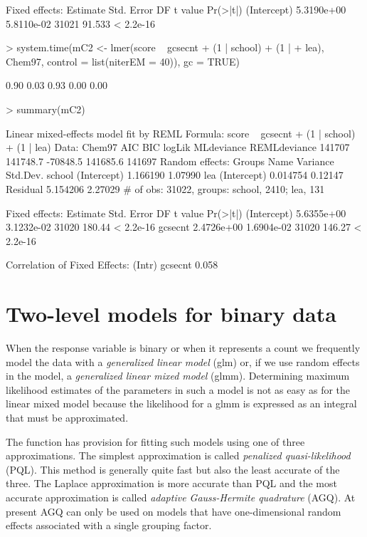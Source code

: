 \documentclass[12pt]{article}
\begin{document}
\begin{Schunk}
\begin{Soutput}
Fixed effects:
              Estimate Std. Error    DF t value  Pr(>|t|)
(Intercept) 5.3190e+00 5.8110e-02 31021  91.533 < 2.2e-16
\end{Soutput}
\begin{Sinput}
> system.time(mC2 <- lmer(score ~ gcsecnt + (1 | school) + (1 | 
+     lea), Chem97, control = list(niterEM = 40)), gc = TRUE)
\end{Sinput}
\begin{Soutput}
[1] 0.90 0.03 0.93 0.00 0.00
\end{Soutput}
\begin{Sinput}
> summary(mC2)
\end{Sinput}
\begin{Soutput}
Linear mixed-effects model fit by REML
Formula: score ~ gcsecnt + (1 | school) + (1 | lea) 
   Data: Chem97 
    AIC      BIC   logLik MLdeviance REMLdeviance
 141707 141748.7 -70848.5   141685.6       141697
Random effects:
 Groups   Name        Variance Std.Dev.
 school   (Intercept) 1.166190 1.07990 
 lea      (Intercept) 0.014754 0.12147 
 Residual             5.154206 2.27029 
# of obs: 31022, groups: school, 2410; lea, 131

Fixed effects:
              Estimate Std. Error    DF t value  Pr(>|t|)
(Intercept) 5.6355e+00 3.1232e-02 31020  180.44 < 2.2e-16
gcsecnt     2.4726e+00 1.6904e-02 31020  146.27 < 2.2e-16

Correlation of Fixed Effects:
        (Intr)
gcsecnt 0.058 
\end{Soutput}
\end{Schunk}


\section{Two-level models for binary data}
\label{sec:TwolevelBinary}

When the response variable is binary or when it represents a count we
frequently model the data with a \emph{generalized linear model} (glm)
or, if we use random effects in the model, a \emph{generalized linear
  mixed model} (glmm).  Determining maximum likelihood estimates of
the parameters in such a model is not as easy as for the linear mixed
model because the likelihood for a glmm is expressed as an integral
that must be approximated. 

The  function has provision for fitting such models using
one of three approximations.  The simplest approximation
is called \emph{penalized quasi-likelihood} (PQL). This method is
generally quite fast but also the least accurate of the three.  The
Laplace approximation is more accurate than PQL and the most accurate
approximation is called \emph{adaptive Gauss-Hermite quadrature}
(AGQ).  At present AGQ can only be used on models that have
one-dimensional random effects associated with a single
grouping factor.
\end{document}
